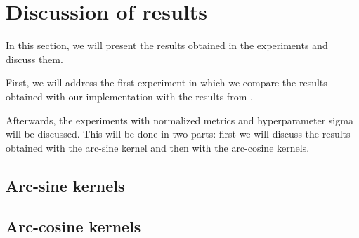 \chapter{Discussion of results}
\label{sec:analysis}

In this section, we will present the results obtained in the experiments
and discuss them.

First, we will address the first experiment in which we compare the results
obtained with our implementation with the results from
\textcite{frenayParameterinsensitiveKernelExtreme2011}.

Afterwards, the experiments with normalized metrics and hyperparameter sigma
will be discussed. This will be done in two parts: first we will discuss the
results obtained with the arc-sine kernel and then with the arc-cosine kernels.



\pagebreak
\section{Arc-sine kernels}



\pagebreak
\section{Arc-cosine kernels}




